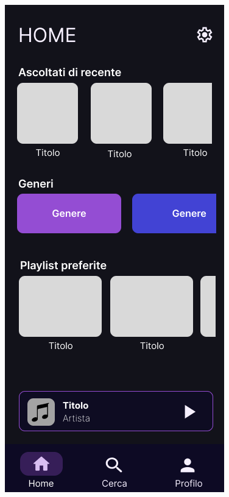 \documentclass{article}
\begin{document}
		\begin{center}
			\begin{figure}[htbp]
				\centering
				\begin{minipage}[t]{0.2\textwidth}
					\centering
					\includegraphics[width=\textwidth]{home_page}

\end{minipage}
\end{figure}
\end{center}
\end{document}
